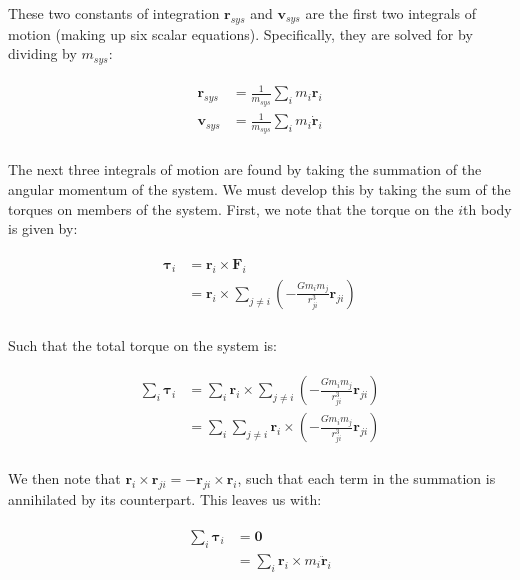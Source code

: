 \documentclass[
]{article}
\begin{document}
These two constants of integration \(\mathbf{r}_{sys}\) and
\(\mathbf{v}_{sys}\) are the first two integrals of motion (making up
six scalar equations). Specifically, they are solved for by dividing by
\(m_{sys}\):

\[\begin{aligned}
\begin{aligned}
    \mathbf{r}_{sys} &= \frac{1}{m_{sys}} \sum_i m_i \mathbf{r}_i \\
    \mathbf{v}_{sys} &= \frac{1}{m_{sys}} \sum_i m_i \dot{\mathbf{r}}_i \\
\end{aligned}
\end{aligned}\]

The next three integrals of motion are found by taking the summation of
the angular momentum of the system. We must develop this by taking the
sum of the torques on members of the system. First, we note that the
torque on the \(i\)th body is given by:

\[\begin{aligned}
\begin{aligned}
    \mathbf{\tau}_i &= \mathbf{r}_i \times \mathbf{F}_i \\
    &= \mathbf{r}_i \times \sum_{j \neq i} \left( -\frac{G m_i m_j}{r_{ji}^3} \mathbf{r}_{ji} \right) \\
\end{aligned}
\end{aligned}\]

Such that the total torque on the system is:

\[\begin{aligned}
\begin{aligned}
    \sum_i \mathbf{\tau}_i &= \sum_i \mathbf{r}_i \times \sum_{j \neq i} \left( -\frac{G m_i m_j}{r_{ji}^3} \mathbf{r}_{ji} \right) \\
    &= \sum_i \sum_{j \neq i} \mathbf{r}_i \times \left( -\frac{G m_i m_j}{r_{ji}^3} \mathbf{r}_{ji} \right) \\
\end{aligned}
\end{aligned}\]

We then note that
\(\mathbf{r}_i \times \mathbf{r}_{ji} = -\mathbf{r}_{ji} \times \mathbf{r}_i\),
such that each term in the summation is annihilated by its counterpart.
This leaves us with:

\[\begin{aligned}
\begin{aligned}
    \sum_i \mathbf{\tau}_i &= \mathbf{0} \\
    &= \sum_i \mathbf{r}_i \times m_i \ddot{\mathbf{r}}_i
\end{aligned}
\end{aligned}\]
\end{document}
